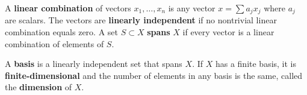 A \textbf{linear combination} of vectors $x_1, \ldots, x_n$ is any vector $x = \sum a_j x_j$ where $a_j$ are scalars. The vectors are \textbf{linearly independent} if no nontrivial linear combination equals zero. A set $S \subset X$ \textbf{spans} $X$ if every vector is a linear combination of elements of $S$.

A \textbf{basis} is a linearly independent set that spans $X$. If $X$ has a finite basis, it is \textbf{finite-dimensional} and the number of elements in any basis is the same, called the \textbf{dimension} of $X$.
